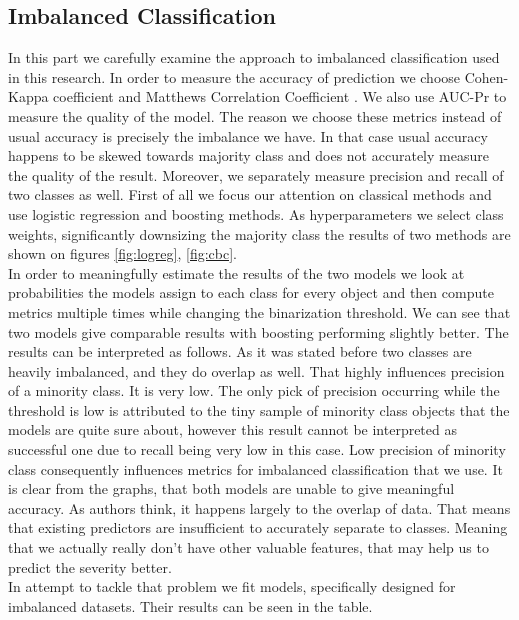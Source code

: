 \subsection{Imbalanced Classification}
In this part we carefully examine the approach to imbalanced classification used in this research.
In order to measure the accuracy of prediction we choose Cohen-Kappa coefficient \cite{CKS} and Matthews Correlation Coefficient
\cite{MCC_intro, MCC_2000, MCC_new}.
We also use AUC-Pr to measure the quality of the model. The reason we choose these metrics instead of usual accuracy is precisely the imbalance we have.
In that case usual accuracy happens to be skewed towards majority class and does not accurately measure the quality of the result.
Moreover, we separately measure precision and recall of two classes as well.
First of all we focus our attention on classical methods and use logistic regression and boosting methods.
As hyperparameters we select class weights, significantly downsizing the majority class the results of two methods are shown on figures
\ref{fig:logreg}, \ref{fig:cbc}. \\
In order to meaningfully estimate the results of the two models we look at probabilities the models assign to each class
for every object and then compute metrics multiple times while changing the binarization threshold.
We can see that two models give comparable results with boosting performing slightly better. The results can be interpreted as follows.
As it was stated before two classes are heavily imbalanced, and they do overlap as well.
That highly influences precision of a minority class. It is very low.
The only pick of precision occurring while the threshold is low is attributed to the tiny sample of minority class objects
that the models are quite sure about, however this result cannot be interpreted as successful one due to recall being very low in this case. 
Low precision of minority class consequently influences metrics for imbalanced classification that we use. 
It is clear from the graphs, that both models are unable to give meaningful accuracy.
As authors think, it happens largely to the overlap of data.
That means that existing predictors are insufficient to accurately separate to classes.
Meaning that we actually really don’t have other valuable features, that may help us to predict the severity better. \\
In attempt to tackle that problem we fit models, specifically designed for imbalanced datasets.
Their results can be seen in the table.

